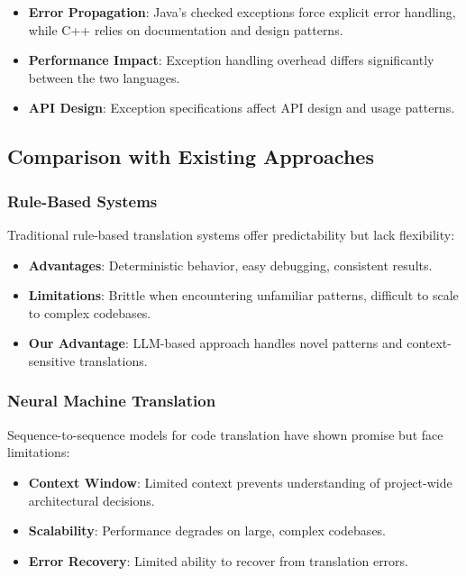 \begin{itemize}
\item \textbf{Error Propagation}: Java's checked exceptions force explicit error handling, while C++ relies on documentation and design patterns.
\item \textbf{Performance Impact}: Exception handling overhead differs significantly between the two languages.
\item \textbf{API Design}: Exception specifications affect API design and usage patterns.
\end{itemize}

\subsection{Comparison with Existing Approaches}

\subsubsection{Rule-Based Systems}
Traditional rule-based translation systems offer predictability but lack flexibility:

\begin{itemize}
\item \textbf{Advantages}: Deterministic behavior, easy debugging, consistent results.
\item \textbf{Limitations}: Brittle when encountering unfamiliar patterns, difficult to scale to complex codebases.
\item \textbf{Our Advantage}: LLM-based approach handles novel patterns and context-sensitive translations.
\end{itemize}

\subsubsection{Neural Machine Translation}
Sequence-to-sequence models for code translation have shown promise but face limitations:

\begin{itemize}
\item \textbf{Context Window}: Limited context prevents understanding of project-wide architectural decisions.
\item \textbf{Scalability}: Performance degrades on large, complex codebases.
\item \textbf{Error Recovery}: Limited ability to recover from translation errors.
\end{itemize}

